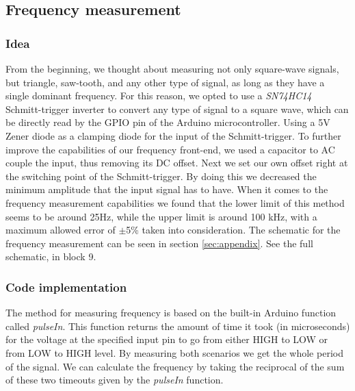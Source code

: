 \subsection{Frequency measurement}
\label{sec:method_frequency}

\subsubsection{Idea}
From the beginning, we thought about measuring not only square-wave signals, but triangle, saw-tooth, and any other type of signal, as long as they have a single dominant frequency. For this reason, we opted to use a \textit{SN74HC14} Schmitt-trigger inverter to convert any type of signal to a square wave, which can be directly read by the GPIO pin of the Arduino microcontroller. Using a 5V Zener diode as a clamping diode for the input of the Schmitt-trigger. To further improve the capabilities of our frequency front-end, we used a capacitor to AC couple the input, thus removing its DC offset. Next we set our own offset right at the switching point of the Schmitt-trigger. By doing this we decreased the minimum amplitude that the input signal has to have. When it comes to the frequency measurement capabilities we found that the lower limit of this method seems to be around 25Hz, while the upper limit is around 100 kHz, with a maximum allowed error of $\pm$5\% taken into consideration.
The schematic for the frequency measurement can be seen in section \ref{sec:appendix}. See the full schematic, in block 9.

\subsubsection{Code implementation}
The method for measuring frequency is based on the built-in Arduino function called \textit{pulseIn}. This function returns the amount of time it took (in microseconds) for the voltage at the specified input pin to go from either HIGH to LOW or from LOW to HIGH level. By measuring both scenarios we get the whole period of the signal. We can calculate the frequency by taking the reciprocal of the sum of these two timeouts given by the \textit{pulseIn} function.